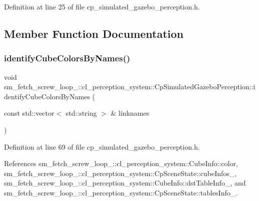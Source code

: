 Definition at line 25 of file cp\+\_\+simulated\+\_\+gazebo\+\_\+perception.\+h.



\subsection{Member Function Documentation}
\mbox{\label{classsm__fetch__screw__loop__1_1_1cl__perception__system_1_1CpSimulatedGazeboPerception_ac54440671eebf57be9d13b07902e47b2}} 
\subsubsection{\texorpdfstring{identify\+Cube\+Colors\+By\+Names()}{identifyCubeColorsByNames()}}
{\footnotesize\ttfamily void sm\+\_\+fetch\+\_\+screw\+\_\+loop\+\_\+::cl\+\_\+perception\+\_\+system\+::\+Cp\+Simulated\+Gazebo\+Perception\+::identify\+Cube\+Colors\+By\+Names (\begin{DoxyParamCaption}\item[{const std\+::vector$<$ std\+::string $>$ \&}]{linknames }\end{DoxyParamCaption})\hspace{0.3cm}{\ttfamily [inline]}}



Definition at line 69 of file cp\+\_\+simulated\+\_\+gazebo\+\_\+perception.\+h.



References sm\+\_\+fetch\+\_\+screw\+\_\+loop\+\_\+::cl\+\_\+perception\+\_\+system\+::\+Cube\+Info\+::color, sm\+\_\+fetch\+\_\+screw\+\_\+loop\+\_\+::cl\+\_\+perception\+\_\+system\+::\+Cp\+Scene\+State\+::cube\+Infos\+\_\+, sm\+\_\+fetch\+\_\+screw\+\_\+loop\+\_\+::cl\+\_\+perception\+\_\+system\+::\+Cube\+Info\+::dst\+Table\+Info\+\_\+, and sm\+\_\+fetch\+\_\+screw\+\_\+loop\+\_\+::cl\+\_\+perception\+\_\+system\+::\+Cp\+Scene\+State\+::tables\+Info\+\_\+.


